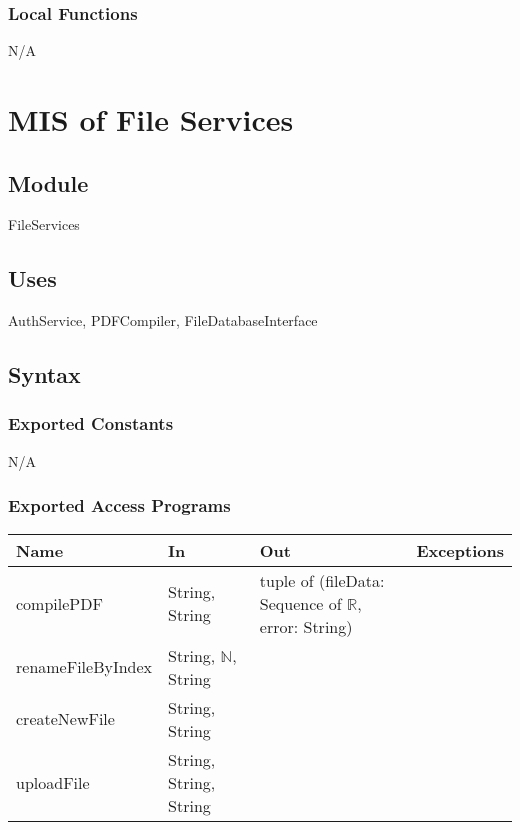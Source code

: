 \documentclass[12pt, titlepage]{article}
\begin{document}
	\subsubsection{Local Functions}
	
	N/A
	
	\newpage
	
	\section{MIS of File Services} \label{Module}
	
	\subsection{Module}
	
	FileServices
	
	\subsection{Uses}
	
	AuthService, PDFCompiler, FileDatabaseInterface
	
	\subsection{Syntax}
	
	\subsubsection{Exported Constants}
	
	N/A
	
	\subsubsection{Exported Access Programs}
	
	\footnotesize\begin{center}
		\begin{tabular}{l  l  l  l}
			\hline
			\textbf{Name} & \textbf{In} & \textbf{Out} & \textbf{Exceptions} \\
			\hline
			compilePDF & String, String & tuple of (fileData: Sequence of $\mathbb{R}$, error: String) &  \\
			\hline
			renameFileByIndex & String, $\mathbb{N}$, String & & \\
			\hline
			createNewFile & String, String & & \\
			\hline
			uploadFile & String, String, String & & \\
			\hline
		\end{tabular}
	\end{center}
	\normalsize
	
\end{document}
